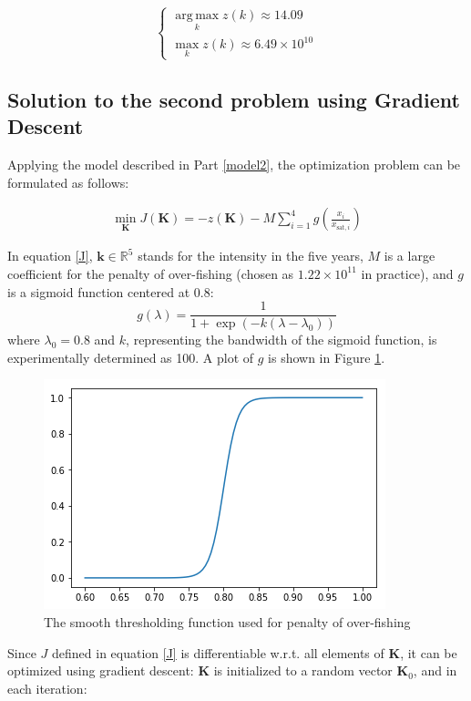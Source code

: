 \documentclass{IEEEtran}
\DeclareMathOperator*{\argmax}{arg\,max}
\begin{document}
$$\begin{cases}\argmax\limits_k z(k) \approx 14.09\\\max\limits_k z(k) \approx 6.49\times 10^{10} \end{cases}$$

\subsection{Solution to the second problem using Gradient Descent}

Applying the model described in Part \ref{model2}, the optimization problem can be formulated as follows:

\begin{equation}\begin{aligned}
	\label{J}
	\min\limits_{ \boldsymbol{K}} J(\boldsymbol{K}) = -z( \boldsymbol{K}) - M \sum\limits_{i=1}^4 g(\frac{x_i}{x_{ \mathrm{sat}, i}})
\end{aligned}\end{equation}

In equation \ref{J}, $\boldsymbol{k}\in \mathbb{R}^5$ stands for the intensity in the five years, $M$ is a large coefficient for the penalty of over-fishing (chosen as $1.22\times 10^{11}$ in practice), and $g$ is a sigmoid function centered at 0.8:
$$g(\lambda) = \frac1{1+ \exp(-k(\lambda - \lambda_0))}$$
where $\lambda_0 = 0.8$ and $k$, representing the bandwidth of the sigmoid function, is experimentally determined as 100. A plot of $g$ is shown in Figure \ref{g}.

\begin{figure}[h]
	\centering
	\includegraphics[width=0.6\columnwidth]{g}
	\caption{The smooth thresholding function used for penalty of over-fishing\label{g}}
\end{figure}

Since $J$ defined in equation \ref{J} is differentiable w.r.t. all elements of $\boldsymbol{K}$, it can be optimized using gradient descent: $\boldsymbol{K}$ is initialized to a random vector $\boldsymbol{K}_0$, and in each iteration:
\end{document}
